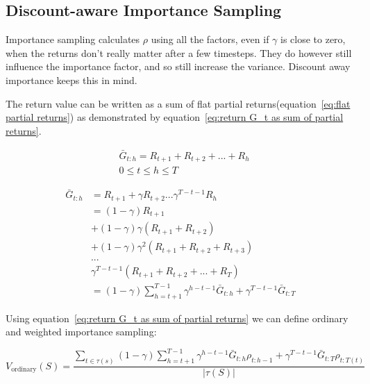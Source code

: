 \subsection{Discount-aware Importance Sampling}

Importance sampling calculates $\rho$ using all the factors, even if $\gamma$ is close to zero, when the returns don't really matter after a few timesteps. They do however still influence the importance factor, and so still increase the variance. Discount away importance keeps this in mind.

The return value can be written as a sum of flat partial returns(equation~\ref{eq:flat partial returns}) as demonstrated by equation~\ref{eq:return G_t as sum of partial returns}.

\begin{equation}
\begin{split}
& \bar{G}_{t:h} = R_{t+1} + R_{t+2} + ... + R_h   \\ 
& 0 \leq t \le h \leq T
\end{split}
\label{eq:flat partial returns}
\end{equation}

\begin{equation}
\begin{split}
\bar{G}_{t:h} & = R_{t+1} + \gamma R_{t+2} ... \gamma^{T-t-1}R_h \\
& = (1-\gamma)R_{t+1} \\
& + (1-\gamma)\gamma (R_{t+1} + R_{t+2}) \\
& + (1-\gamma)\gamma^2(R_{t+1} + R_{t+2} + R_{t+3}) \\
& ... \\
& \gamma^{T-t-1}(R_{t+1} + R_{t+2} + ... + R_{T}) \\
& = (1-\gamma)\sum_{h=t+1}^{T-1}\gamma^{h-t-1}\bar{G}_{t:h} + \gamma^{T-t-1}\bar{G}_{t:T}
\end{split}
\label{eq:return G_t as sum of partial returns}
\end{equation}

Using equation~\ref{eq:return G_t as sum of partial returns} we can define ordinary and weighted importance sampling:

\begin{equation}
V_{\text{ordinary}}(S) = \frac{\sum_{t\in\tau(s)}(1-\gamma)\sum_{h=t+1}^{T-1}\gamma^{h-t-1}\bar{G}_{t:h}\rho_{t:h-1} + \gamma^{T-t-1}\bar{G}_{t:T}\rho_{t:T(t)}}{|\tau(S)|}
\label{eq:discount-away ordinary importance sampling}
\end{equation}

